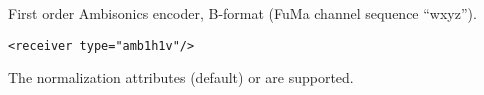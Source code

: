 First order Ambisonics encoder, B-format (FuMa channel sequence
``wxyz'').

\begin{lstlisting}[numbers=none]
<receiver type="amb1h1v"/>
\end{lstlisting}

The normalization attributes  (default) or
 are supported.


